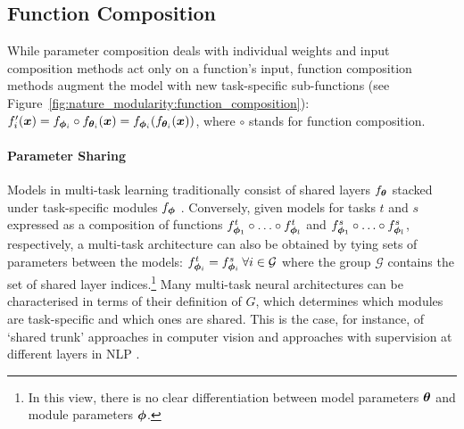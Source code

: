 \documentclass[10pt]{article} %
\begin{document}
\subsection{Function Composition}
\label{sec:nature_modularity:layers}

While parameter composition deals with individual weights and input composition methods act only on a function's input, function composition methods augment the model with new task-specific sub-functions (see Figure~\ref{fig:nature_modularity:function_composition}): $f_i^\prime({\bm{x}}) = f_{{\bm{\phi}}_i} \circ f_{{\bm{\theta}}_i}({\bm{x}}) = f_{{\bm{\phi}}_i}(f_{{\bm{\theta}}_i}({\bm{x}}))$, where $\circ$ stands for function composition.

\paragraph*{Parameter Sharing} Models in multi-task learning traditionally consist of shared layers $f_{{\bm{\theta}}}$ stacked under task-specific modules $f_{\bm{\phi}}$ \citep{ruder2017overview}. Conversely, given models for tasks $t$ and $s$ expressed as a composition of functions $f_{{\bm{\phi}}_1}^t \circ \ldots \circ f_{{\bm{\phi}}_l}^t$ and $f_{{\bm{\phi}}_1}^s \circ \ldots \circ f_{{\bm{\phi}}_l}^s$, respectively, a multi-task architecture can also be obtained by tying sets of parameters between the models: $f_{{\bm{\phi}}_i}^t = f_{{\bm{\phi}}_i}^s  \: \forall i \in \mathcal{G}$ where the group $\mathcal{G}$ contains the set of shared layer indices.\footnote{In this view, there is no clear differentiation between model parameters ${\bm{\theta}}$ and module parameters ${\bm{\phi}}$.} Many multi-task neural architectures can be characterised in terms of their definition of $G$, which determines which modules are task-specific and which ones are shared. This is the case, for instance, of `shared trunk' approaches in computer vision \citep{zhang2014facial,Ma2018Modeling} and approaches with supervision at different layers in NLP \citep{sogaard2016deep,sanh2019hierarchical,liu2019multi}.

 
\end{document}
